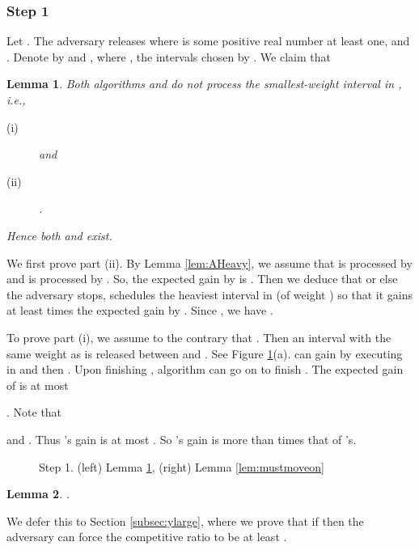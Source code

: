 \documentclass[11pt]{article}
\newtheorem{lemma}{Lemma}[section]
\newcommand{\qed}{\hspace*{\fill}\par\medskip}
\newenvironment{proof}{\noindent{\it Proof. }\ignorespaces}{\qed}
\begin{document}
\subsubsection{Step 1}
  \label{subsec:step1}

Let .
The adversary releases 
where  is some positive real number at least one,
 and .
Denote by  and , where ,
the intervals chosen by .
We claim that

\begin{lemma} \label{lem:x1>v1}
Both algorithms  and  do not process the smallest-weight
interval in , i.e.,
\begin{description}
\item[{\rm (i)}]
 and
\item[{\rm (ii)}]
.
\end{description}
Hence both  and  exist.
\end{lemma}

\begin{proof}
We first prove part (ii).
By Lemma \ref{lem:AHeavy}, we assume that  is processed by 
and  is processed by .
So, the expected gain by  is  .
Then we deduce that  or else the adversary stops,
 schedules the heaviest interval in  (of weight )
so that it gains at least  times the expected gain
by . 
Since  ,
we have .

To prove part (i), we assume to the contrary that .
Then an interval  with the same weight as 
is released between  and .
See Figure \ref{fig:step1}(a).
 can gain 
by executing  in  and then .
Upon finishing , algorithm  can go on to finish .
The expected gain of  is at most

.
Note that 

and  .
Thus 's gain is at most
 . 
So 's gain is more than  times that of
's.
\end{proof}

\begin{figure}
\centerline{ \epsfysize=1.1in  
             \hspace{0.8in}
             \epsfysize=1.40in  }
\caption{Step 1. (left) Lemma \ref{lem:x1>v1}, 
  (right) Lemma \ref{lem:mustmoveon} }
\label{fig:step1}
\end{figure}

\begin{lemma} \label{lem:case1}
.
\end{lemma}

We defer this to Section \ref{subsec:ylarge},
where we prove that if  then the adversary
can force the competitive ratio to be at least .
\end{document}
